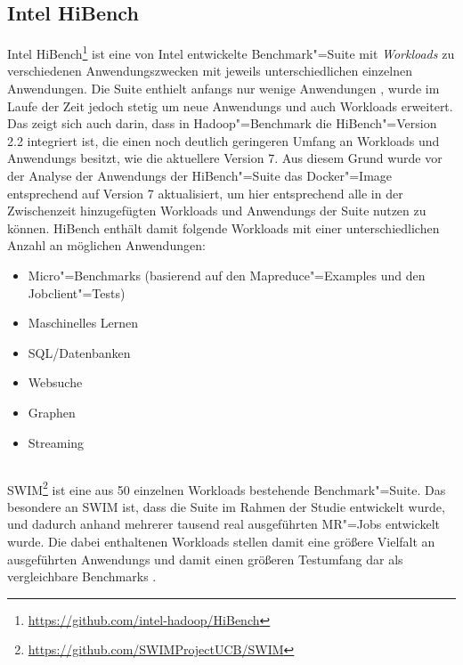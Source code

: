 \subsection{Intel HiBench}
\label{subsec:hibench}

Intel HiBench\footnote{\url{https://github.com/intel-hadoop/HiBench}} ist eine von Intel entwickelte Benchmark"=Suite mit \emph{Workloads} zu verschiedenen Anwendungszwecken mit jeweils unterschiedlichen einzelnen Anwendungen.
Die Suite enthielt anfangs nur wenige Anwendungen \cite{Huang2010}, wurde im Laufe der Zeit jedoch stetig um neue \glspl{Anwendung} und auch Workloads erweitert.
Das zeigt sich auch darin, dass in Hadoop"=Benchmark die HiBench"=Version \mbox{2.2} integriert ist, die einen noch deutlich geringeren Umfang an Workloads und \glspl{Anwendung} besitzt, wie \zB die aktuellere Version 7.
Aus diesem Grund wurde vor der Analyse der \glspl{Anwendung} der HiBench"=Suite das Docker"=Image entsprechend auf Version 7 aktualisiert, um hier entsprechend alle in der Zwischenzeit hinzugefügten Workloads und \glspl{Anwendung} der Suite nutzen zu können.
HiBench enthält damit folgende Workloads mit einer unterschiedlichen Anzahl an möglichen Anwendungen:

\begin{itemize}
    \item Micro"=Benchmarks (basierend auf den Mapreduce"=Examples und den Jobclient"=Tests)
    \item Maschinelles Lernen
    \item SQL/Datenbanken
    \item Websuche
    \item Graphen
    \item Streaming
\end{itemize}

\subsection{}
\label{subsec:swim}

\gls{SWIM}\footnote{\url{https://github.com/SWIMProjectUCB/SWIM}} ist eine aus 50 einzelnen Workloads bestehende Benchmark"=Suite.
Das besondere an \gls{SWIM} ist, dass die Suite im Rahmen der Studie \cite{Chen2012} entwickelt wurde, und dadurch anhand mehrerer tausend real ausgeführten \gls{MR}"=Jobs entwickelt wurde.
Die dabei enthaltenen Workloads stellen damit eine größere Vielfalt an ausgeführten \glspl{Anwendung} und damit einen größeren Testumfang dar als vergleichbare Benchmarks \cite{SwimWikiHome}.

